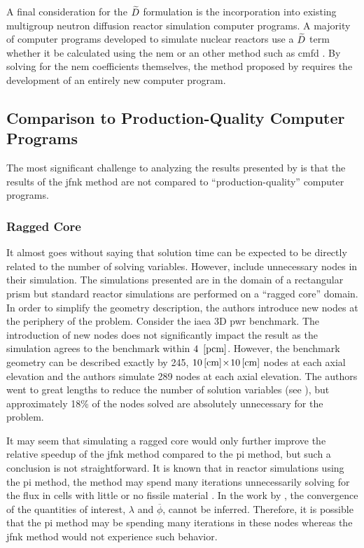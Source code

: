    A final consideration for the $\widetilde{D}$ formulation is the incorporation
    into existing multigroup neutron diffusion reactor simulation computer
    programs. A majority of computer programs developed to simulate nuclear
    reactors use a $\widetilde{D}$ term whether it be calculated using the \gls{nem}
    or an other method such as \gls{cmfd} \cite{casmo4,simulate3,mpact}. By
    solving for the \gls{nem} coefficients themselves, the method proposed by
    \citeauthor{qe2paper} requires the development of an entirely new computer
    program.

  \subsection{Comparison to Production-Quality Computer Programs}

    The most significant challenge to analyzing the results presented by
    \citeauthor{qe2paper} is that the results of the \gls{jfnk} method are not
    compared to ``production-quality'' computer programs. 
    
    \subsubsection{Ragged Core}

      It almost goes without saying that solution time can be expected to be
      directly related to the number of solving variables. However,
      \citeauthor{qe2paper} include unnecessary nodes in their simulation. The
      simulations presented are in the domain of a rectangular prism but
      standard reactor simulations are performed on a ``ragged core'' domain. In
      order to simplify the geometry description, the authors introduce new
      nodes at the periphery of the problem. Consider the \gls{iaea} 3D
      \gls{pwr} benchmark. The introduction of new nodes does not significantly
      impact the result as the simulation agrees to the benchmark within
      $4~\left[\text{{pcm}}\right]$. However, the benchmark geometry can be described exactly
      by 245, $10\left[\text{{cm}}\right] \! \times \! 10\left[\text{{cm}}\right]$ nodes at each axial
      elevation and the authors simulate 289 nodes at each axial elevation. The
      authors went to great lengths to reduce the number of solution variables
      (see ), but approximately 18\% of the nodes
      solved are absolutely unnecessary for the problem.

      It may seem that simulating a ragged core would only further improve the
      relative speedup of the \gls{jfnk} method compared to the \gls{pi} method,
      but such a conclusion is not straightforward. It is known that in reactor
      simulations using the \gls{pi} method, the method may spend many
      iterations unnecessarily solving for the flux in cells with little or no
      fissile material \cite{gehinThesis}. In the work by \citeauthor{qe2paper},
      the convergence of the quantities of interest, $\lambda$ and
      $\overline{\phi}$, cannot be inferred. Therefore, it is possible that the
      \gls{pi} method may be spending many iterations in these nodes whereas the
      \gls{jfnk} method would not experience such behavior.

